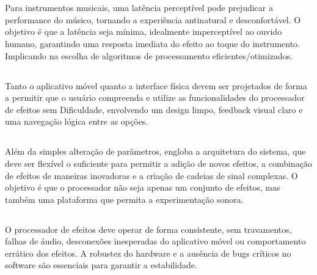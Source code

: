 \section{}

\subsection{}

Para instrumentos musicais, uma latência perceptível pode prejudicar a performance do músico, tornando a experiência antinatural e desconfortável. O objetivo é que a latência seja mínima, idealmente imperceptível ao ouvido humano, garantindo uma resposta imediata do efeito ao toque do instrumento. Implicando na escolha de algoritmos de processamento eficientes/otimizados.

\subsection{}

Tanto o aplicativo móvel quanto a interface física devem ser projetados de forma a permitir que o usuário compreenda e utilize as funcionalidades do processador de efeitos sem Dificuldade, envolvendo um design limpo, feedback visual claro e uma navegação lógica entre as opções.

\subsection{}

Além da simples alteração de parâmetros, engloba a arquitetura do sistema, que deve ser flexível o suficiente para permitir a adição de novos efeitos, a combinação de efeitos de maneiras inovadoras e a criação de cadeias de sinal complexas. O objetivo é que o processador não seja apenas um conjunto de efeitos, mas também uma plataforma que permita a experimentação sonora.

\subsection{}

O processador de efeitos deve operar de forma consistente, sem travamentos, falhas de áudio, desconexões inesperadas do aplicativo móvel ou comportamento errático dos efeitos. A robustez do hardware e a ausência de bugs críticos no software são essenciais para garantir a estabilidade.

